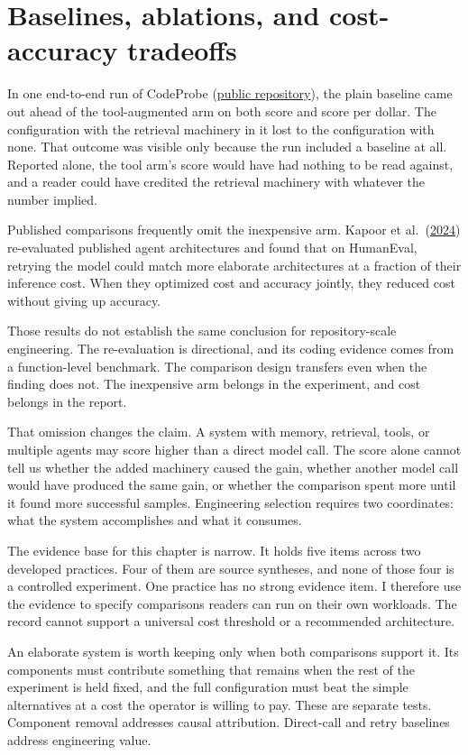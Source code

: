 \chapter{Baselines, ablations, and cost-accuracy tradeoffs}
\label{ch02-baselines-ablations-cost-accuracy}
In one end-to-end run of CodeProbe (\href{https://github.com/sjarmak/codeprobe}{public repository}), the plain baseline came out ahead of the tool-augmented arm on both score and score per dollar. The configuration with the retrieval machinery in it lost to the configuration with none. That outcome was visible only because the run included a baseline at all. Reported alone, the tool arm's score would have had nothing to be read against, and a reader could have credited the retrieval machinery with whatever the number implied.

Published comparisons frequently omit the inexpensive arm. Kapoor et al.~(\href{https://arxiv.org/abs/2407.01502}{2024}) re-evaluated published agent architectures and found that on HumanEval, retrying the model could match more elaborate architectures at a fraction of their inference cost. When they optimized cost and accuracy jointly, they reduced cost without giving up accuracy.

Those results do not establish the same conclusion for repository-scale engineering. The re-evaluation is directional, and its coding evidence comes from a function-level benchmark. The comparison design transfers even when the finding does not. The inexpensive arm belongs in the experiment, and cost belongs in the report.

That omission changes the claim. A system with memory, retrieval, tools, or multiple agents may score higher than a direct model call. The score alone cannot tell us whether the added machinery caused the gain, whether another model call would have produced the same gain, or whether the comparison spent more until it found more successful samples. Engineering selection requires two coordinates: what the system accomplishes and what it consumes.

The evidence base for this chapter is narrow. It holds five items across two developed practices. Four of them are source syntheses, and none of those four is a controlled experiment. One practice has no strong evidence item. I therefore use the evidence to specify comparisons readers can run on their own workloads. The record cannot support a universal cost threshold or a recommended architecture.

An elaborate system is worth keeping only when both comparisons support it. Its components must contribute something that remains when the rest of the experiment is held fixed, and the full configuration must beat the simple alternatives at a cost the operator is willing to pay. These are separate tests. Component removal addresses causal attribution. Direct-call and retry baselines address engineering value.


